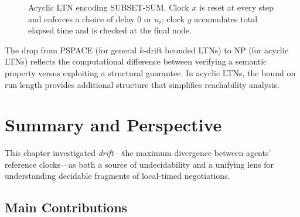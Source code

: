 \begin{figure}[t]
\centering
{}
\caption{Acyclic LTN encoding SUBSET-SUM. Clock $x$ is reset at every step and enforces a choice of delay 0 or $n_i$; clock $y$ accumulates total elapsed time and is checked at the final node.}
\label{fig:subset-sum-ltn}
\end{figure}

The drop from PSPACE (for general $k$-drift bounded LTNs) to NP (for acyclic LTNs) reflects the computational difference between verifying a semantic property versus exploiting a structural guarantee. In acyclic LTNs, the bound on run length provides additional structure that simplifies reachability analysis.

\section{Summary and Perspective}
\label{sec:drift-summary}

This chapter investigated \emph{drift}—the maximum divergence between agents' reference clocks—as both a source of undecidability and a unifying lens for understanding decidable fragments of local-timed negotiations.

\subsection*{Main Contributions}

